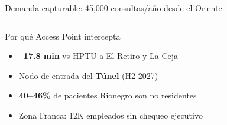 \documentclass[aspectratio=169, 11pt]{beamer}
\begin{document}
\begin{frame}{Demanda capturable: 45,000 consultas/año desde el Oriente}
\begin{columns}[T]
\vspace{6pt}
\begin{exampleblock}{\small Por qué Access Point intercepta}
\scriptsize
\begin{itemize}\setlength{\itemsep}{0pt}\setlength{\parskip}{0pt}
  \item \textbf{--17.8 min} vs HPTU a El Retiro y La Ceja
  \item Nodo de entrada del \textbf{Túnel} (H2 2027)
  \item \textbf{40--46\%} de pacientes Rionegro son no residentes
  \item Zona Franca: 12K empleados sin chequeo ejecutivo
\end{itemize}
\end{exampleblock}
\end{columns}
\end{frame}
\end{document}
